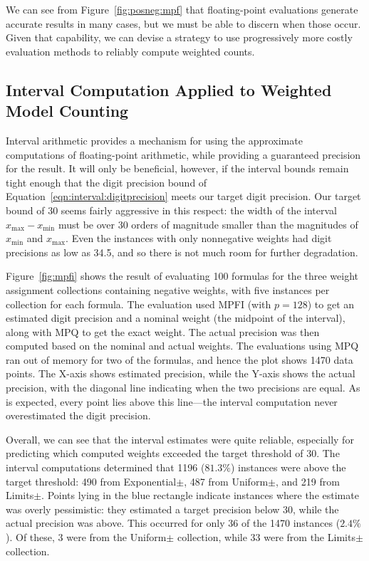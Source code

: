\documentclass[letterpaper,USenglish,cleveref, autoref, thm-restate]{lipics-v2021}
\newcommand{\xmin}{x_{\textrm{min}}}
\newcommand{\xmax}{x_{\textrm{max}}}
\begin{document}
We can see from Figure~\ref{fig:posneg:mpf} that floating-point
evaluations generate accurate results in many cases, but we must be
able to discern when those occur.  Given that capability, we can
devise a strategy to use progressively more costly evaluation methods
to reliably compute weighted counts.

\subsection{Interval Computation Applied to Weighted Model Counting}

Interval arithmetic provides a mechanism for using the approximate
computations of floating-point arithmetic, while providing a
guaranteed precision for the result.  It will only be beneficial,
however, if the interval bounds remain tight enough that the digit
precision bound of Equation~\ref{eqn:interval:digitprecision} meets
our target digit precision.  Our target bound of 30 seems fairly
aggressive in this respect: the width of the interval $\xmax-\xmin$
must be over 30 orders of magnitude smaller than the magnitudes of
$\xmin$ and $\xmax$.  Even the instances with only nonnegative weights
had digit precisions as low as 34.5, and so there is not much
room for further degradation.

Figure~\ref{fig:mpfi} shows the result of evaluating 100 formulas for
the three weight assignment collections containing negative weights,
with five instances per collection for each formula.  
The evaluation used
MPFI (with $p=128$) to get an estimated digit precision and
a nominal weight (the midpoint of the interval), along with MPQ to get
the exact weight.  The actual precision was then computed based on the
nominal and actual weights.  The evaluations using MPQ ran out of
memory for two of the formulas, and hence the plot shows 1470
data points.  The X-axis shows estimated precision, while the Y-axis
shows the actual precision, with the diagonal line indicating when the
two precisions are equal.  As is expected, every point lies above this
line---the interval computation never overestimated the digit
precision.

Overall, we can see that the interval estimates were quite reliable,
especially for predicting which computed weights exceeded the target
threshold of 30.
The
interval computations determined that 1196 ($81.3\%$) instances were
above the target threshold: 490 from \textsf{Exponential$\pm$}, 487 from
\textsf{Uniform$\pm$}, and 219 from \textsf{Limits$\pm$}.
Points lying in the blue rectangle
indicate instances where the estimate was overly pessimistic: they
estimated a target precision below 30, while the actual precision was
above.  This occurred for only 36 of the 1470 instances ($2.4\%$).  Of
these, 3 were from the \textsf{Uniform$\pm$} collection, while 33 were
from the \textsf{Limits$\pm$} collection.  
\end{document}
